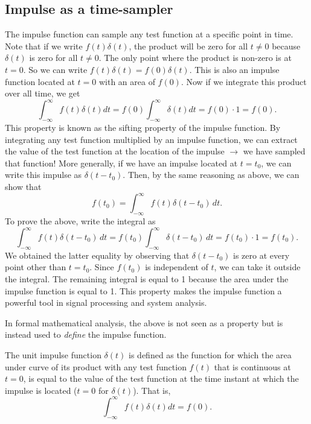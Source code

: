 \subsection{Impulse as a time-sampler}
The impulse function can sample any test function at a specific point in time. Note that if we write $f(t)\delta(t)$, the product will be zero for all $t \neq 0$ because $\delta(t)$ is zero for all $t \neq 0$. The only point where the product is non-zero is at $t = 0$. So we can write $f(t)\delta(t) = f(0)\delta(t)$. This is also an impulse function located at $t = 0$ with an area of $f(0)$. Now if we integrate this product over all time, we get
\[\int_{-\infty}^{\infty} f(t) \delta(t) dt = f(0) \int_{-\infty}^{\infty} \delta(t) dt = f(0) \cdot 1 = f(0).\]
This property is known as the sifting property of the impulse function. By integrating any test function multiplied by an impulse function, we can extract the value of the test function at the location of the impulse $\rightarrow$ we have sampled that function! More generally, if we have an impulse located at $t = t_0$, we can write this impulse as $\delta(t - t_0)$. Then, by the same reasoning as above, we can show that\
\[
f(t_0) = \int_{-\infty}^{\infty} f(t) \delta(t - t_0) \, dt.
\]
To prove the above, write the integral as
\[
\int_{-\infty}^{\infty} f(t) \delta(t - t_0) \, dt = f(t_0) \int_{-\infty}^{\infty} \delta(t - t_0) \, dt = f(t_0) \cdot 1 = f(t_0).
\]
We obtained the latter equality by observing that $\delta(t - t_0)$ is zero at every point other than $t = t_0$. Since $f(t_0)$ is independent of $t$, we can take it outside the integral. The remaining integral is equal to 1 because the area under the impulse function is equal to 1. This property makes the impulse function a powerful tool in signal processing and system analysis.

In formal mathematical analysis, the above is not seen as a property but is instead used to \emph{define} the impulse function.
\begin{definition}
The unit impulse function $\delta(t)$ is defined as the function for which the area under curve of its product with any test function $f(t)$ that is continuous at $t = 0$, is equal to the value of the test function at the time instant at which the impulse is located ($t = 0$ for $\delta(t)$). That is,
\begin{equation}
\label{eq:impulse_def}
    \int_{-\infty}^{\infty} f(t) \delta(t) dt = f(0).
\end{equation}

\end{definition}
